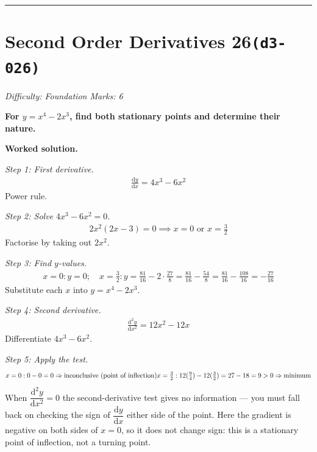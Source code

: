 \documentclass[11pt]{article}
\newcommand{\question}[1]{\par\medskip\noindent\textbf{#1}\par}
\begin{document}
\medskip\hrule

\section*{Second Order Derivatives 26\quad\small\texttt{(d3-026)}}
\textit{Difficulty: Foundation \quad\textbar\quad Marks: 6}

\question{For \( y = x^4 - 2x^3 \), find both stationary points and determine their nature.}

\textbf{Worked solution.}

\textit{Step 1: First derivative.}
\[\begin{gathered}
\frac{\mathrm{d}y}{\mathrm{d}x} = 4x^3 - 6x^2
\end{gathered}\]
Power rule.

\textit{Step 2: Solve \( 4x^3 - 6x^2 = 0 \).}
\[\begin{gathered}
2x^2(2x - 3) = 0 \implies x = 0 \text{ or } x = \tfrac{3}{2}
\end{gathered}\]
Factorise by taking out \( 2x^2 \).

\textit{Step 3: Find \( y \)-values.}
\[\begin{gathered}
x=0: y=0; \quad x=\tfrac{3}{2}: y = \tfrac{81}{16} - 2 \cdot \tfrac{27}{8} = \tfrac{81}{16} - \tfrac{54}{8} = \tfrac{81}{16} - \tfrac{108}{16} = -\tfrac{27}{16}
\end{gathered}\]
Substitute each \( x \) into \( y = x^4 - 2x^3 \).

\textit{Step 4: Second derivative.}
\[\begin{gathered}
\frac{\mathrm{d}^2y}{\mathrm{d}x^2} = 12x^2 - 12x
\end{gathered}\]
Differentiate \(4x^3 - 6x^2\).

\textit{Step 5: Apply the test.}
\[\begin{gathered}
x=0: 0 - 0 = 0 \Rightarrow \text{inconclusive (point of inflection)} \newline x=\tfrac{3}{2}: 12(\tfrac{9}{4}) - 12(\tfrac{3}{2}) = 27 - 18 = 9 > 0 \Rightarrow \text{minimum}
\end{gathered}\]
When \( \dfrac{\mathrm{d}^2y}{\mathrm{d}x^2} = 0 \) the second-derivative test gives no information --- you must fall back on checking the sign of \( \dfrac{\mathrm{d}y}{\mathrm{d}x} \) either side of the point. Here the gradient is negative on both sides of \(x=0\), so it does not change sign: this is a stationary point of inflection, not a turning point.
\end{document}
